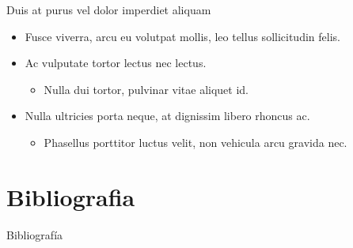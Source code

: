 \documentclass{beamer} %
\begin{document}
  \begin{frame}{Duis at purus vel dolor imperdiet aliquam}
    \begin{itemize}
      \item<1-2> Fusce viverra, arcu eu volutpat mollis, leo tellus sollicitudin felis.
      \item<2-5> Ac vulputate tortor lectus nec lectus.
      \begin{itemize}
	\item<3>  Nulla dui tortor, pulvinar vitae aliquet id.
      \end{itemize}
      \item<4-5> Nulla ultricies porta neque, at dignissim libero rhoncus ac.
      \begin{itemize}
	\item<5-> Phasellus porttitor luctus velit, non vehicula arcu gravida nec.
      \end{itemize}
    \end{itemize}
  \end{frame}

\section*{Bibliografia}
  \begin{frame}[allowframebreaks]{Bibliografía}
    \beamertemplatearticlebibitems
    
    
  \end{frame}

\end{document}
